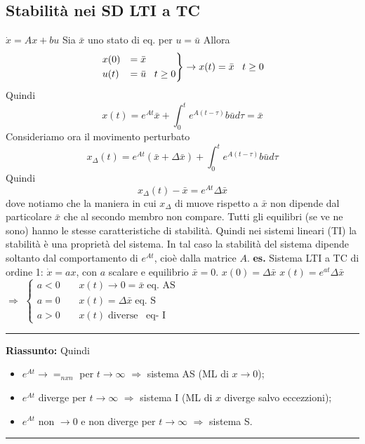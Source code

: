\subsection{Stabilità nei SD LTI a TC}
$\dot{x} = Ax + bu$\newline
Sia $\bar{x}$ uno stato di eq. per $u = \bar{u}$\newline
Allora
\[
    \begin{rcases}
        x(0) &= \bar{x}\\
        u(t) &= \bar{u} \;\;\; t\geq 0
    \end{rcases} \rightarrow  x(t) = \bar{x} \;\;\;t \geq 0
\]
Quindi
\[
    x(t) = e^{At} \bar{x} + \int_{0}^{t}e^{A(t-\tau)} b \bar{u} d \tau = \bar{x}
\]
Consideriamo ora il movimento perturbato 
\[
    x_{\Delta}(t) = e^{At}(\bar{x} + \Delta \bar{x}) + \int_{0}^{t}e^{A(t- \tau)}b \bar{u} d \tau
\]
Quindi 
\[
    x_\Delta (t) - \bar{x} = e^{At} \Delta \bar{x}
\]
dove notiamo che la maniera in cui $x_\Delta$ di muove rispetto a $\bar{x}$ non dipende dal particolare $\bar{x}$ che al secondo membro non compare.\newline
\newline
Tutti gli equilibri (se ve ne sono) hanno le stesse caratteristiche di stabilità.\newline
Quindi nei sistemi lineari (TI) la stabilità è una proprietà del sistema.\newline
In tal caso la stabilità del sistema dipende soltanto dal comportamento di $e^{At}$, cioè dalla matrice $A$.\newline
\newline
\textbf{es.}  Sistema LTI a TC di ordine 1:\newline
$\dot{x} = a x$, con $a$ scalare e equilibrio $\bar{x} = 0$.\newline
$x(0) = \Delta \bar{x}$\newline
$x(t) = e^{at} \Delta \bar{x}$ $\Rightarrow $ $\begin{cases}
    a < 0 \;\;\;\; & x(t) \rightarrow  0 = \bar{x} \;\text{eq. AS}\;\\
    a = 0 \;\;\;\; & x(t) = \Delta \bar{x} \;\text{eq. S}\;\\
    a > 0 \;\;\;\; & x(t) \;\text{diverse}\;\;\;\text{eq- I}\;
\end{cases}$\newline
\newline
\rule{\textwidth}{0,4pt}\newline
\textbf{Riassunto:}\newline
Quindi 
\begin{itemize}
    \item $e^{At} \rightarrow  =_{nxn}$ per $t \rightarrow  \infty$ $\Longrightarrow$ sistema AS (ML di $x \rightarrow  0$);
    \item $e^{At}$ diverge per $t \rightarrow  \infty$ $\Longrightarrow$ sistema I (ML di $x$ diverge salvo eccezzioni);
    \item $e^{At}$ non $\rightarrow  0$ e non diverge per $t \rightarrow  \infty$ $\Longrightarrow$ sistema S.
\end{itemize}
\rule{\textwidth}{0,4pt}
